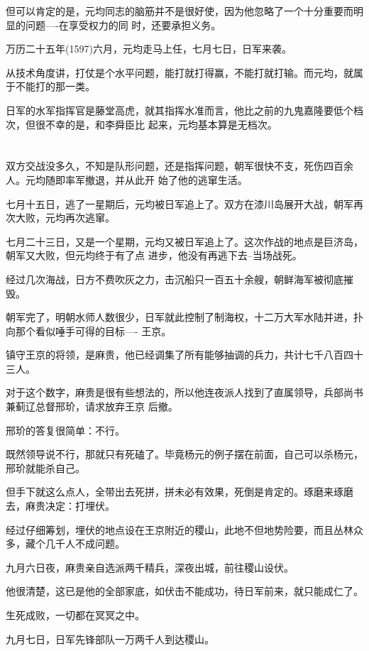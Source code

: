 \documentclass[11pt,a4paper,onecolumn]{article}
\begin{document}
但可以肯定的是，元均同志的脑筋并不是很好使，因为他忽略了一个十分重要而明显的问题----在享受权力的同
时，还要承担义务。

万历二十五年(1597)六月，元均走马上任，七月七日，日军来袭。

从技术角度讲，打仗是个水平问题，能打就打得赢，不能打就打输。而元均，就属于不能打的那一类。

日军的水军指挥官是藤堂高虎，就其指挥水准而言，他比之前的九鬼嘉隆要低个档次，但很不幸的是，和李舜臣比
起来，元均基本算是无档次。

\section[\thesection]{}

双方交战没多久，不知是队形问题，还是指挥问题，朝军很快不支，死伤四百余人。元均随即率军撤退，并从此开
始了他的逃窜生活。

七月十五日，逃了一星期后，元均被日军追上了。双方在漆川岛展开大战，朝军再次大败，元均再次逃窜。

七月二十三日，又是一个星期，元均又被日军追上了。这次作战的地点是巨济岛，朝军又大败，但元均终于有了点
进步，他没有再逃下去--当场战死。

经过几次海战，日方不费吹灰之力，击沉船只一百五十余艘，朝鲜海军被彻底摧毁。

朝军完了，明朝水师人数很少，日军就此控制了制海权，十二万大军水陆并进，扑向那个看似唾手可得的目标----
王京。

镇守王京的将领，是麻贵，他已经调集了所有能够抽调的兵力，共计七千八百四十三人。

对于这个数字，麻贵是很有些想法的，所以他连夜派人找到了直属领导，兵部尚书兼蓟辽总督邢玠，请求放弃王京
后撤。

邢玠的答复很简单：不行。

既然领导说不行，那就只有死磕了。毕竟杨元的例子摆在前面，自己可以杀杨元，邢玠就能杀自己。

但手下就这么点人，全带出去死拼，拼未必有效果，死倒是肯定的。琢磨来琢磨去，麻贵决定：打埋伏。

经过仔细筹划，埋伏的地点设在王京附近的稷山，此地不但地势险要，而且丛林众多，藏个几千人不成问题。

九月六日夜，麻贵亲自选派两千精兵，深夜出城，前往稷山设伏。

他很清楚，这已是他的全部家底，如伏击不能成功，待日军前来，就只能成仁了。

生死成败，一切都在冥冥之中。

九月七日，日军先锋部队一万两千人到达稷山。
\end{document}
